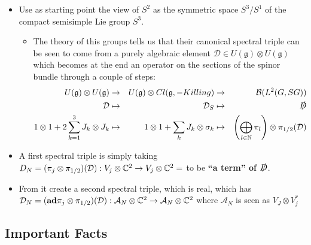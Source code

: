 \documentclass{article}
\newcommand{\alg}[1]{\ensuremath{\mathfrak{#1}}}
\begin{document}
\begin{itemize}
        \begin{itemize}
        
            \item Use as starting point the view of $S^2$ as the symmetric space $S^3/S^1$ of the compact semisimple Lie group $S^3$.
        
                \begin{itemize}
                    
                \item The theory of this groups tells us that their canonical spectral triple can be seen to come from a purely algebraic element $\mathcal D \in U(\alg g) \otimes U(\alg g)$ which becomes at the end an operator on the sections of the spinor bundle through a couple of steps:
                \begin{align}
                    U(\alg g) \otimes U(\alg g) &\to& U(\alg g) \otimes Cl(\alg g, -Killing) &\to& \mathcal B(L^2(G, SG)) \\
                    \mathcal D  &\mapsto& \mathcal D_S &\mapsto& \slashed D \\
                    1 \otimes 1 + 2 \sum_{k = 1}^3 J_k \otimes J_k &\mapsto& 1 \otimes 1 + \sum_k J_k \otimes \sigma_k &\mapsto& \left( \bigoplus_{l\in \NN} \pi_l \right) \otimes \pi_{1/2}(\mathcal D)
                \end{align}
                
                \end{itemize}
            
            \item A first spectral triple is simply taking $D_N = (\pi_j \otimes \pi_{1/2})(\mathcal D): V_j \otimes \mathbb{C}^2 \to V_j \otimes \mathbb{C}^2 = $ to be \textbf{``a term'' of $\slashed D$}.
            
            \item From it create a second spectral triple, which is real, which has $\mathcal D_N = (\textbf{ad}\pi_j \otimes \pi_{1/2})(\mathcal D): \mathcal A_N \otimes \mathbb{C}^2 \to \mathcal A_N \otimes \mathbb{C}^2$ where $\mathcal A_N$ is seen as $V_J \otimes V_j^*$
            
        \end{itemize}
    
    \end{itemize}

\subsection{Important Facts}
\end{document}

